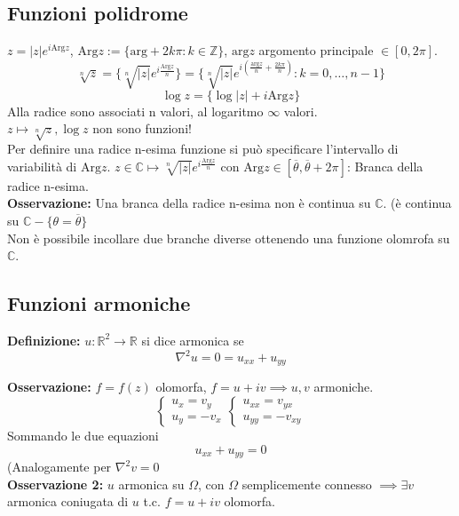 \documentclass[a4paper]{article}
\newcommand{\R}{\mathbb{R}}
\newcommand{\C}{\mathbb{C}}
\newcommand{\Z}{\mathbb{Z}}
\begin{document}
\subsection{Funzioni polidrome}
$z=|z|e^{i\text{Arg}z}$, $\text{Arg}z:=\{\text{arg}+2k\pi:k\in\Z\} $, $\text{arg}z$ argomento principale $\in[0,2\pi]$.
\[\sqrt[n]{z}=\{\sqrt[n]{|z|}e^{i \frac{\text{Arg}z}{n}} \}=\{\sqrt[n]{|z|}e^{i( \frac{\text{arg}z}{n}+ \frac{2k\pi}{n})}:k=0,\ldots,n-1 \} \]
\[\log z=\{\log |z|+i\text{Arg}z\}\]
Alla radice sono associati n valori, al logaritmo $\infty$ valori.
\\$z \mapsto \sqrt[n]{z},\log z$ non sono funzioni!
\\Per definire una radice n-esima funzione si può specificare l'intervallo di variabilità di $\text{Arg}z$.
$z\in\C\mapsto \sqrt[n]{|z|} e^{i \frac{\text{Arg}z}{n}}$ con $\text{Arg}z\in[\overline \theta,\overline\theta+2\pi]$: Branca della radice n-esima.
\\\textbf{Osservazione:} Una branca della radice n-esima non è continua su $\C$. (è continua su $\C-\{\theta=\overline\theta\}$
\\Non è possibile incollare due branche diverse ottenendo una funzione olomrofa su $\C$.
\subsection{Funzioni armoniche}
\begin{tcolorbox}
	\textbf{Definizione:} $u:\R^2\to \R$ si dice armonica se 
	\[\nabla^2 u=0=u_{x x}+u_{y y}\]
\end{tcolorbox}
\textbf{Osservazione:} $f=f(z)$ olomorfa, $f=u+iv\implies u,v$ armoniche.
\[\begin{cases}
	u_x=v_y
	\\u_y=-v_x
\end{cases}
\begin{cases}
	u_{x x}=v_{y x}\\
	u_{y y}=-v_{xy}
\end{cases}
\]
Sommando le due equazioni
\[u_{x x}+u_{y y}=0\]
(Analogamente per $\nabla ^2 v=0$
\\\textbf{Osservazione 2:} $u$ armonica su $\Omega$, con $\Omega$ semplicemente connesso $\implies\exists v$ armonica coniugata di $u$ t.c. $f=u+iv$ olomorfa.
\end{document}
